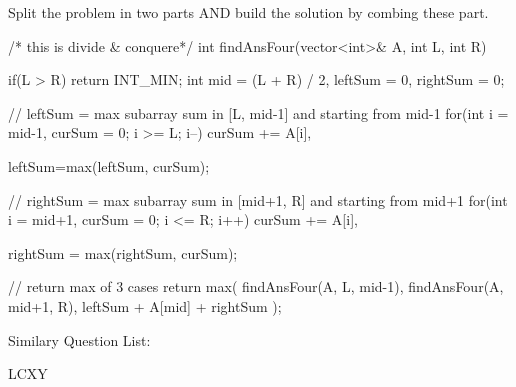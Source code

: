 \begin{solution}
    Split the problem in two parts AND build the solution by combing these part.
    
    \begin{code}
    /* this is divide & conquere*/
    int findAnsFour(vector<int>& A, int L, int R){
        if(L > R) return INT_MIN;
        int mid = (L + R) / 2, leftSum = 0, rightSum = 0;

        // leftSum = max subarray sum in [L, mid-1] and starting from mid-1
        for(int i = mid-1, curSum = 0; i >= L; i--)
            curSum += A[i],
        
        leftSum=max(leftSum, curSum);

        // rightSum = max subarray sum in [mid+1, R] and starting from mid+1
        for(int i = mid+1, curSum = 0; i <= R; i++)
            curSum += A[i],
        
        rightSum = max(rightSum, curSum);        

        // return max of 3 cases 
        return max({ findAnsFour(A, L, mid-1), findAnsFour(A, mid+1, R), leftSum + A[mid] + rightSum });
    }	
    \end{code}
\end{solution}


Similary Question List:
\begin{asparaenum}[(a)]
    \item LCXY
\end{asparaenum}
